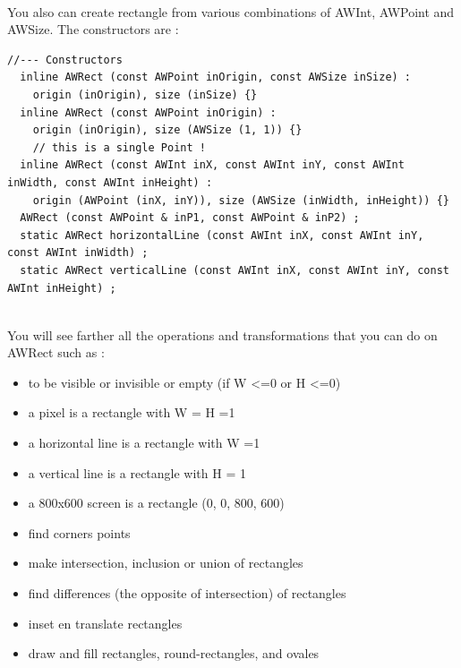 \documentclass[a4paper,11pt]{extarticle}
\begin{document}
~\\ You also can create rectangle from various combinations of AWInt, AWPoint and AWSize. The constructors are :
\begin{lstlisting}[language=Arduinonl]
  //--- Constructors
  inline AWRect (const AWPoint inOrigin, const AWSize inSize) : 
  	origin (inOrigin), size (inSize) {}
  inline AWRect (const AWPoint inOrigin) : 
  	origin (inOrigin), size (AWSize (1, 1)) {} 
	// this is a single Point !
  inline AWRect (const AWInt inX, const AWInt inY, const AWInt inWidth, const AWInt inHeight) :
  	origin (AWPoint (inX, inY)), size (AWSize (inWidth, inHeight)) {}
  AWRect (const AWPoint & inP1, const AWPoint & inP2) ;
  static AWRect horizontalLine (const AWInt inX, const AWInt inY, const AWInt inWidth) ;
  static AWRect verticalLine (const AWInt inX, const AWInt inY, const AWInt inHeight) ;
\end{lstlisting}


~\\ You will see farther all the operations and transformations that you can do on AWRect such as :
\begin{itemize}
\item to be visible or invisible or empty (if W <=0 or H <=0)
\item a pixel is a rectangle with W = H =1
\item a horizontal line is a rectangle with W =1
\item a vertical line is a rectangle with H = 1
\item a 800x600 screen is a rectangle (0, 0, 800, 600)
\item find corners points
\item make intersection, inclusion or union of rectangles
\item find differences (the opposite of intersection) of rectangles
\item inset en translate rectangles
\item draw and fill rectangles, round-rectangles, and ovales
\end{itemize}
\end{document}
